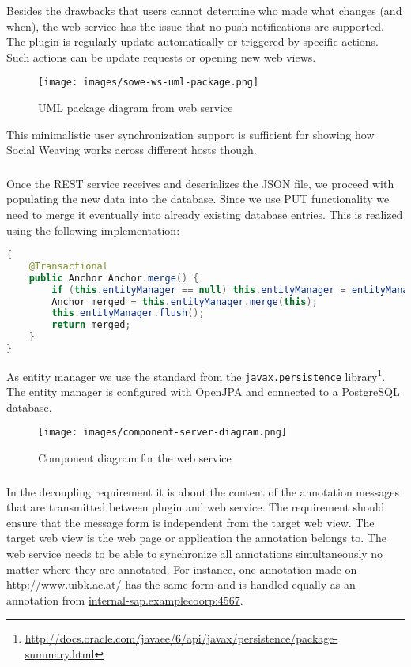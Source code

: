 Besides the drawbacks that users cannot determine who made what changes (and when), the web service has the issue that no push notifications are supported. The plugin is regularly update automatically or triggered by specific actions. Such actions can be update requests or opening new web views. 

\begin{figure}\centering
		\texttt{[image: images/sowe-ws-uml-package.png]}
		\caption{UML package diagram from web service}
		\label{sowe-ws-uml-package}
\end{figure} 

This minimalistic user synchronization support is sufficient for showing how Social Weaving works across different hosts though.

\subsubsection[Persistence]{\reqWSiii}
Once the REST service receives and deserializes the JSON file, we proceed with populating the new data into the database. Since we use PUT functionality we need to merge it eventually into already existing database entries. This is realized using the following implementation:

\begin{lstlisting}[language=Java]
{
    @Transactional
    public Anchor Anchor.merge() {
        if (this.entityManager == null) this.entityManager = entityManager();
        Anchor merged = this.entityManager.merge(this);
        this.entityManager.flush();
        return merged;
    }
}
\end{lstlisting}

As entity manager we use the standard from the \verb^javax.persistence^ library\footnote{\url{http://docs.oracle.com/javaee/6/api/javax/persistence/package-summary.html}}. The entity manager is configured with OpenJPA and connected to a PostgreSQL database. 

\begin{figure}
	\texttt{[image: images/component-server-diagram.png]}
	\caption{Component diagram for the web service}
	\label{component-server-diagram}
\end{figure}

\subsubsection[Decoupling Web Service and Target Web View]{\reqWSiv}\label{reqWSiv}
In the decoupling requirement it is about the content of the annotation messages that are transmitted between plugin and web service. The requirement should ensure that the message form is independent from the target web view. The target web view is the web page or application the annotation belongs to. 
The web service needs to be able to synchronize all annotations simultaneously no matter where they are annotated. For instance, one annotation made on \url{http://www.uibk.ac.at/} has the same form and is handled equally as an annotation from \url{internal-sap.examplecoorp:4567}. 

